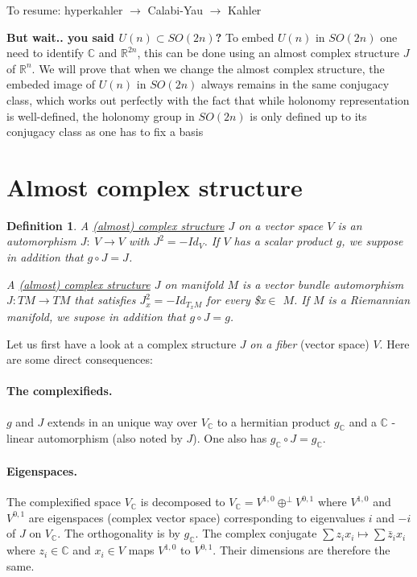 \documentclass[11pt]{article}
\newtheorem{definition}{Definition}
\begin{document}
To resume: hyperkahler \(\longrightarrow\) Calabi-Yau \(\longrightarrow\) Kahler

\textbf{But wait.. you said \(U(n)\subset SO(2n)\)?} To embed \(U(n)\) in \(SO(2n)\) one need to identify \(\mathbb{C}\) and \(\mathbb{R}^{2n}\), this can be done using an almost complex structure \(J\) of \(\mathbb{R}^n\). We will prove that when we change the almost complex structure, the embeded image of
\(U(n)\) in \(SO(2n)\) always remains in the same conjugacy class, which works out perfectly with the
fact that while holonomy representation is well-defined, the holonomy group in \(SO(2n)\) is only
defined up to its conjugacy class as one has to fix a basis

\section*{Almost complex structure}
\label{sec:org706d1aa}
\begin{definition}
A \uline{(almost) complex structure} \(J\) on a vector space \(V\) is an automorphism \(J:\ V\longrightarrow V\)
with \(J^2 = -Id_V\). If \(V\) has a scalar product \(g\), we suppose in addition that \(g\circ J = J\).

A \uline{(almost) complex structure} \(J\) on manifold \(M\) is a vector bundle automorphism \(J: TM\longrightarrow
TM\) that satisfies \(J_x^2 = -Id_{T_xM}\) for every \$x\(\in\) \(M\). If \(M\) is a Riemannian manifold, we
supose in addition that \(g\circ J = g\).
\end{definition}

Let us first have a look at a complex structure \(J\) \emph{on a fiber} (vector space) \(V\). Here are some
direct consequences:
\paragraph*{The complexifieds.}
\label{sec:org634ef6a}
\(g\) and \(J\) extends in an unique way over \(V_{ \mathbb{C}}\) to a
hermitian product \(g_{\mathbb{C}}\) and a \(\mathbb{C}\) -linear automorphism (also noted by \(J\)). One
also has \(g_{\mathbb{C}}\circ J = g_{\mathbb{C}}\).

\paragraph*{Eigenspaces.}
\label{sec:org9357df9}
The complexified space \(V_{ \mathbb{C}}\) is decomposed to \(V_{\mathbb{C}} =
V^{1,0} \oplus^\perp V^{0,1}\) where \(V^{1,0}\) and \(V^{0,1}\) are eigenspaces (complex vector space)
corresponding to eigenvalues \(i\) and \(-i\) of \(J\) on \(V_{\mathbb{C}}\). The orthogonality is by
\(g_{\mathbb{C}}\). The complex conjugate \(\sum z_i x_i \mapsto \sum \bar z_i x_i\) where \(z_i\in
\mathbb{C}\) and \(x_i\in V\) maps \(V^{1,0}\) to \(V^{0,1}\). Their dimensions are therefore the same.
\end{document}
